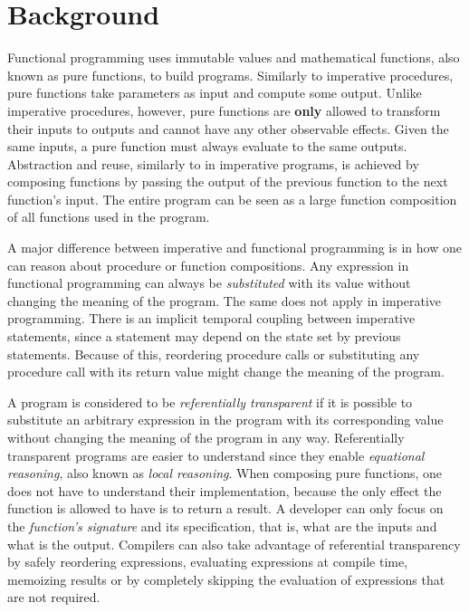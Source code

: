 \chapter{Background} \label{Background}

Functional programming uses immutable values and mathematical functions, also known as pure functions, to build programs. Similarly to imperative procedures, pure functions take parameters as input and compute some output. Unlike imperative procedures, however, pure functions are \textbf{only} allowed to transform their inputs to outputs and cannot have any other observable effects. Given the same inputs, a pure function must always evaluate to the same outputs. Abstraction and reuse, similarly to in imperative programs, is achieved by composing functions by passing the output of the previous function to the next function's input. The entire program can be seen as a large function composition of all functions used in the program.

A major difference between imperative and functional programming is in how one can reason about procedure or function compositions. Any expression in functional programming can always be \emph{substituted} with its value without changing the meaning of the program. The same does not apply in imperative programming. There is an implicit temporal coupling between imperative statements, since a statement may depend on the state set by previous statements. Because of this, reordering procedure calls or substituting any procedure call with its return value might change the meaning of the program.~\cite[Chapter~1]{sicp}

A program is considered to be \emph{referentially transparent} if it is possible to substitute an arbitrary expression in the program with its corresponding value without changing the meaning of the program in any way. Referentially transparent programs are easier to understand since they enable \emph{equational reasoning}, also known as \emph{local reasoning}. When composing pure functions, one does not have to understand their implementation, because the only effect the function is allowed to have is to return a result. A developer can only focus on the \emph{function's signature} and its specification, that is, what are the inputs and what is the output. Compilers can also take advantage of referential transparency by safely reordering expressions, evaluating expressions at compile time, memoizing results or by completely skipping the evaluation of expressions that are not required.

